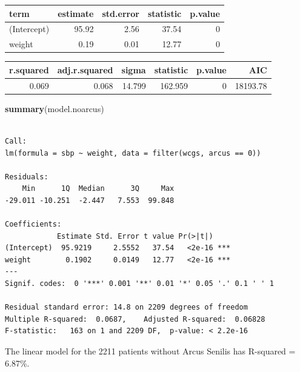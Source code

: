 \documentclass[
]{book}
\newenvironment{Shaded}{\begin{snugshade}}{\end{snugshade}}
\newcommand{\DataTypeTok}[1]{\textcolor[rgb]{0.13,0.29,0.53}{#1}}
\newcommand{\DecValTok}[1]{\textcolor[rgb]{0.00,0.00,0.81}{#1}}
\newcommand{\KeywordTok}[1]{\textcolor[rgb]{0.13,0.29,0.53}{\textbf{#1}}}
\newcommand{\NormalTok}[1]{#1}
\newcommand{\OperatorTok}[1]{\textcolor[rgb]{0.81,0.36,0.00}{\textbf{#1}}}
\newcommand{\StringTok}[1]{\textcolor[rgb]{0.31,0.60,0.02}{#1}}
\begin{document}
\begin{tabular}{l|r|r|r|r}
\hline
term & estimate & std.error & statistic & p.value\\
\hline
(Intercept) & 95.92 & 2.56 & 37.54 & 0\\
\hline
weight & 0.19 & 0.01 & 12.77 & 0\\
\hline
\end{tabular}

\begin{Shaded}
\end{Shaded}

\begin{tabular}{r|r|r|r|r|r}
\hline
r.squared & adj.r.squared & sigma & statistic & p.value & AIC\\
\hline
0.069 & 0.068 & 14.799 & 162.959 & 0 & 18193.78\\
\hline
\end{tabular}

\begin{Shaded}
\begin{Highlighting}[]
\KeywordTok{summary}\NormalTok{(model.noarcus)}
\end{Highlighting}
\end{Shaded}

\begin{verbatim}

Call:
lm(formula = sbp ~ weight, data = filter(wcgs, arcus == 0))

Residuals:
    Min      1Q  Median      3Q     Max 
-29.011 -10.251  -2.447   7.553  99.848 

Coefficients:
            Estimate Std. Error t value Pr(>|t|)    
(Intercept)  95.9219     2.5552   37.54   <2e-16 ***
weight        0.1902     0.0149   12.77   <2e-16 ***
---
Signif. codes:  0 '***' 0.001 '**' 0.01 '*' 0.05 '.' 0.1 ' ' 1

Residual standard error: 14.8 on 2209 degrees of freedom
Multiple R-squared:  0.0687,	Adjusted R-squared:  0.06828 
F-statistic:   163 on 1 and 2209 DF,  p-value: < 2.2e-16
\end{verbatim}

The linear model for the 2211 patients without Arcus Senilis has R-squared = 6.87\%.
\end{document}
